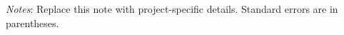 \begin{table}[htbp]
\centering
\caption{Table Caption}
\label{tab:main_results}

\begin{minipage}{0.85\textwidth}
\footnotesize
\textit{Notes}: Replace this note with project-specific details. Standard errors are in parentheses.
\end{minipage}
\end{table}
